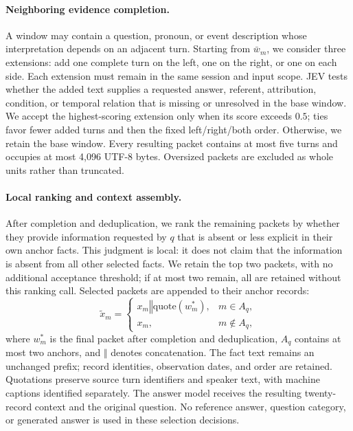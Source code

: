 \documentclass[11pt]{article}
\begin{document}
\paragraph{Neighboring evidence completion.}
A window may contain a question, pronoun, or event description whose interpretation depends on an adjacent turn. Starting from $\bar w_m$, we consider three extensions: add one complete turn on the left, one on the right, or one on each side. Each extension must remain in the same session and input scope. JEV tests whether the added text supplies a requested answer, referent, attribution, condition, or temporal relation that is missing or unresolved in the base window. We accept the highest-scoring extension only when its score exceeds $0.5$; ties favor fewer added turns and then the fixed left/right/both order. Otherwise, we retain the base window. Every resulting packet contains at most five turns and occupies at most 4,096 UTF-8 bytes. Oversized packets are excluded as whole units rather than truncated.

\paragraph{Local ranking and context assembly.}
After completion and deduplication, we rank the remaining packets by whether they provide information requested by $q$ that is absent or less explicit in their own anchor facts. This judgment is local: it does not claim that the information is absent from all other selected facts. We retain the top two packets, with no additional acceptance threshold; if at most two remain, all are retained without this ranking call. Selected packets are appended to their anchor records:
\begin{equation}
 \tilde x_m =
 \begin{cases}
 x_m\mathbin{\Vert}\mathrm{quote}(w_m^*),&m\in A_q,\\
 x_m,&m\notin A_q,
 \end{cases}
 \label{eq:assembly}
\end{equation}
where $w_m^*$ is the final packet after completion and deduplication, $A_q$ contains at most two anchors, and $\Vert$ denotes concatenation. The fact text remains an unchanged prefix; record identities, observation dates, and order are retained. Quotations preserve source turn identifiers and speaker text, with machine captions identified separately. The answer model receives the resulting twenty-record context and the original question. No reference answer, question category, or generated answer is used in these selection decisions.
\end{document}
